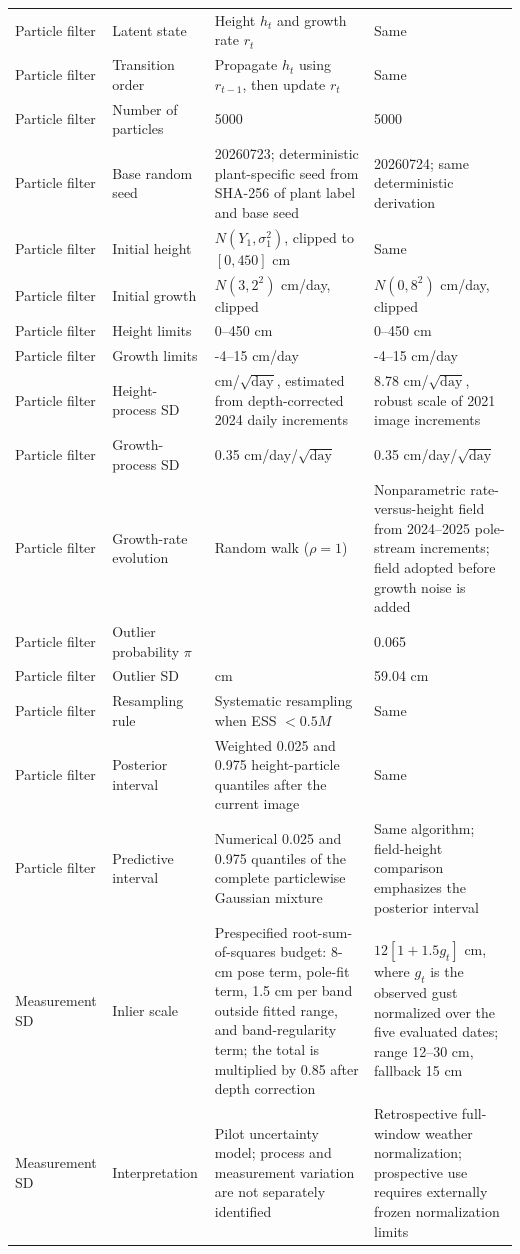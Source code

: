 \documentclass[12pt,letterpaper]{article}
\begin{document}
\begin{longtable}{L{2.45cm}L{4.05cm}L{3.25cm}L{3.25cm}}
Particle filter & Latent state & Height $h_t$ and growth rate $r_t$ & Same \\
Particle filter & Transition order & Propagate $h_t$ using $r_{t-1}$, then update $r_t$ & Same \\
Particle filter & Number of particles & 5000 & 5000 \\
Particle filter & Base random seed & 20260723; deterministic plant-specific seed from SHA-256 of plant label and base seed & 20260724; same deterministic derivation \\
Particle filter & Initial height & $N(Y_1,\sigma_1^2)$, clipped to $[0,450]$ cm & Same \\
Particle filter & Initial growth & $N(3,2^2)$ cm/day, clipped & $N(0,8^2)$ cm/day, clipped \\
Particle filter & Height limits & 0--450 cm & 0--450 cm \\
Particle filter & Growth limits & -4--15 cm/day & -4--15 cm/day \\
Particle filter & Height-process SD & \ProcessHeightSD{} cm/$\sqrt{\mathrm{day}}$, estimated from depth-corrected 2024 daily increments & 8.78 cm/$\sqrt{\mathrm{day}}$, robust scale of 2021 image increments \\
Particle filter & Growth-process SD & 0.35 cm/day/$\sqrt{\mathrm{day}}$ & 0.35 cm/day/$\sqrt{\mathrm{day}}$ \\
Particle filter & Growth-rate evolution & Random walk ($\rho=1$) & Nonparametric rate-versus-height field from 2024--2025 pole-stream increments; field adopted before growth noise is added \\
Particle filter & Outlier probability $\pi$ & \OutlierProbability{} & 0.065 \\
Particle filter & Outlier SD & \OutlierSD{} cm & 59.04 cm \\
Particle filter & Resampling rule & Systematic resampling when ESS $<0.5M$ & Same \\
Particle filter & Posterior interval & Weighted 0.025 and 0.975 height-particle quantiles after the current image & Same \\
Particle filter & Predictive interval & Numerical 0.025 and 0.975 quantiles of the complete particlewise Gaussian mixture & Same algorithm; field-height comparison emphasizes the posterior interval \\

Measurement SD & Inlier scale & Prespecified root-sum-of-squares budget: 8-cm pose term, pole-fit term, 1.5 cm per band outside fitted range, and band-regularity term; the total is multiplied by 0.85 after depth correction & $12[1+1.5g_t]$ cm, where $g_t$ is the observed gust normalized over the five evaluated dates; range 12--30 cm, fallback 15 cm \\
Measurement SD & Interpretation & Pilot uncertainty model; process and measurement variation are not separately identified & Retrospective full-window weather normalization; prospective use requires externally frozen normalization limits \\


\end{longtable}
\end{document}
